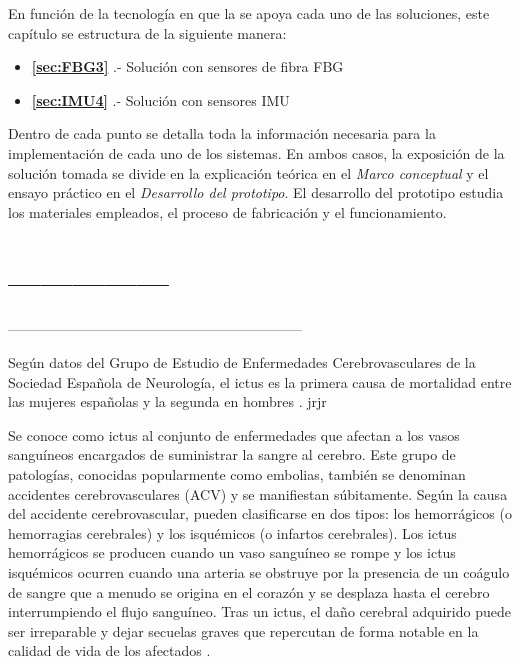 En función de la tecnología en que la se apoya cada uno de las soluciones, %
este capítulo se estructura de la siguiente manera: 
\begin{itemize}
	\item {\textbf{\ref{sec:FBG3}}    .- Solución con sensores de fibra FBG} 
	\item {\textbf{\ref{sec:IMU4}}    .- Solución con sensores IMU}
\end{itemize}
Dentro de cada punto se detalla toda la información necesaria para la implementación de cada uno de los sistemas. En ambos casos, la exposición de la solución tomada se divide en la explicación teórica en el \textit{Marco conceptual} y el ensayo práctico en el \textit{Desarrollo del prototipo}. El desarrollo del prototipo estudia los materiales empleados, el proceso de fabricación y el funcionamiento. 



\section{---------------}

---------------------------------------------------------------

Según datos del Grupo de Estudio de Enfermedades Cerebrovasculares de la Sociedad Española de Neurología, el ictus es la primera causa de mortalidad entre las mujeres españolas y la segunda en hombres \cite{ictuss}. jrjr

Se conoce como ictus al conjunto de enfermedades que afectan a los vasos sanguíneos encargados de suministrar la sangre al cerebro. Este grupo de patologías, conocidas popularmente como embolias, también se denominan accidentes cerebrovasculares (ACV) y se manifiestan súbitamente. Según la causa del accidente cerebrovascular, pueden clasificarse en dos tipos: los hemorrágicos (o hemorragias cerebrales) y los isquémicos (o infartos cerebrales). Los ictus hemorrágicos se producen cuando un vaso sanguíneo se rompe y los ictus isquémicos ocurren cuando una arteria se obstruye por la presencia de un coágulo de sangre que a menudo se origina en el corazón y se desplaza hasta el cerebro interrumpiendo el flujo sanguíneo. Tras un ictus, el daño cerebral adquirido puede ser irreparable y dejar secuelas graves que repercutan de forma notable en la calidad de vida de los afectados \cite{ictus_def}.

